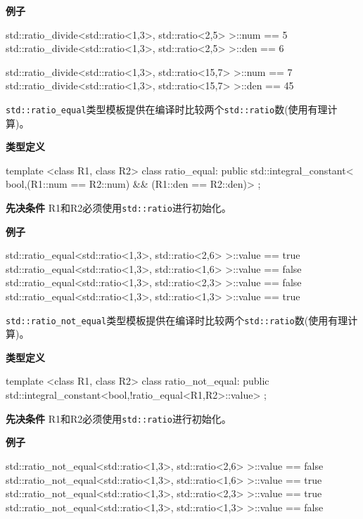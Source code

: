 \textbf{例子}

\begin{cpp}
std::ratio_divide<std::ratio<1,3>, std::ratio<2,5> >::num == 5
std::ratio_divide<std::ratio<1,3>, std::ratio<2,5> >::den == 6

std::ratio_divide<std::ratio<1,3>, std::ratio<15,7> >::num == 7
std::ratio_divide<std::ratio<1,3>, std::ratio<15,7> >::den == 45
\end{cpp}


\texttt{std::ratio\_equal}类型模板提供在编译时比较两个\texttt{std::ratio}数(使用有理计算)。

\textbf{类型定义}

\begin{cpp}
template <class R1, class R2>
class ratio_equal:
  public std::integral_constant<
    bool,(R1::num == R2::num) && (R1::den == R2::den)>
{};
\end{cpp}

\textbf{先决条件}
R1和R2必须使用\texttt{std::ratio}进行初始化。

\textbf{例子}

\begin{cpp}
std::ratio_equal<std::ratio<1,3>, std::ratio<2,6> >::value == true
std::ratio_equal<std::ratio<1,3>, std::ratio<1,6> >::value == false
std::ratio_equal<std::ratio<1,3>, std::ratio<2,3> >::value == false
std::ratio_equal<std::ratio<1,3>, std::ratio<1,3> >::value == true
\end{cpp}


\texttt{std::ratio\_not\_equal}类型模板提供在编译时比较两个\texttt{std::ratio}数(使用有理计算)。

\textbf{类型定义}

\begin{cpp}
template <class R1, class R2>
class ratio_not_equal:
  public std::integral_constant<bool,!ratio_equal<R1,R2>::value>
{};
\end{cpp}

\textbf{先决条件}
R1和R2必须使用\texttt{std::ratio}进行初始化。

\textbf{例子}

\begin{cpp}
std::ratio_not_equal<std::ratio<1,3>, std::ratio<2,6> >::value == false
std::ratio_not_equal<std::ratio<1,3>, std::ratio<1,6> >::value == true
std::ratio_not_equal<std::ratio<1,3>, std::ratio<2,3> >::value == true
std::ratio_not_equal<std::ratio<1,3>, std::ratio<1,3> >::value == false
\end{cpp}

